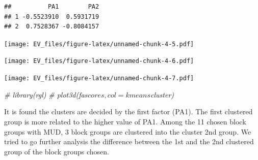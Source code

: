 \documentclass[]{article}
\newenvironment{Shaded}{\begin{snugshade}}{\end{snugshade}}
\newcommand{\KeywordTok}[1]{\textcolor[rgb]{0.13,0.29,0.53}{\textbf{#1}}}
\newcommand{\DataTypeTok}[1]{\textcolor[rgb]{0.13,0.29,0.53}{#1}}
\newcommand{\DecValTok}[1]{\textcolor[rgb]{0.00,0.00,0.81}{#1}}
\newcommand{\StringTok}[1]{\textcolor[rgb]{0.31,0.60,0.02}{#1}}
\newcommand{\CommentTok}[1]{\textcolor[rgb]{0.56,0.35,0.01}{\textit{#1}}}
\newcommand{\OtherTok}[1]{\textcolor[rgb]{0.56,0.35,0.01}{#1}}
\newcommand{\OperatorTok}[1]{\textcolor[rgb]{0.81,0.36,0.00}{\textbf{#1}}}
\newcommand{\NormalTok}[1]{#1}
\begin{document}
\begin{verbatim}
##          PA1        PA2
## 1 -0.5523910  0.5931719
## 2  0.7528367 -0.8084157
\end{verbatim}

\begin{Shaded}
\end{Shaded}

\texttt{[image: EV\_files/figure-latex/unnamed-chunk-4-5.pdf]}

\begin{Shaded}
\end{Shaded}

\texttt{[image: EV\_files/figure-latex/unnamed-chunk-4-6.pdf]}

\begin{Shaded}
\end{Shaded}

\texttt{[image: EV\_files/figure-latex/unnamed-chunk-4-7.pdf]}

\begin{Shaded}
\begin{Highlighting}[]
\CommentTok{# library(rgl)}
\CommentTok{# plot3d(fa$scores, col = kmeans$cluster)}
\end{Highlighting}
\end{Shaded}

It is found the clusters are decided by the first factor (PA1). The
first clustered group is more related to the higher value of PA1. Among
the 11 chosen block groups with MUD, 3 block groups are clustered into
the cluster 2nd group. We tried to go further analysis the difference
between the 1st and the 2nd clustered group of the block groups chosen.
\end{document}
